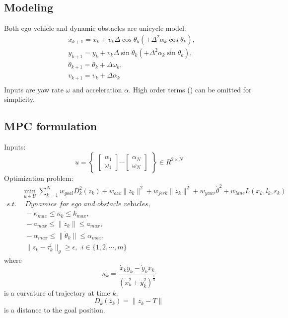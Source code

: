 \documentclass[12pt]{article}
\begin{document}
\subsection*{Modeling}
Both ego vehicle and dynamic obstacles are unicycle model.
\begin{equation}
\begin{split}
&x_{k+1}=x_{k}+v_{k}\Delta \cos\theta_{k}(+\Delta^{2}\alpha_{k}\cos\theta_{k}),\\
&y_{k+1}=y_{k}+v_{k}\Delta \sin\theta_{k}(+\Delta^{2}\alpha_{k}\sin\theta_{k}),\\
&\theta_{k+1}=\theta_{k}+\Delta \omega_{k},\\
&v_{k+1}=v_{k}+\Delta \alpha_{k}\\
\end{split}
\end{equation}
Inputs are yaw rate $\omega$ and acceleration $\alpha$. High order terms () can be omitted for simplicity.
\subsection*{MPC formulation}
Inputs:
\begin{equation}
u=
\begin{Bmatrix}
\begin{bmatrix}
\alpha_1\\ 
\omega_1
\end{bmatrix}
\cdots
\begin{bmatrix}
\alpha_N\\ 
\omega_N
\end{bmatrix}
\end{Bmatrix}\in R^{2\times N}
\end{equation}
Optimization problem:
\begin{equation}
\begin{split}
&\min_{u\in U}\sum_{k=1}^Nw_{goal}D^2_k(z_k)+w_{acc}\|\ddot{z}_k \|^2+w_{jerk}\|\dddot{z_k} \|^2 + w_{yawr}\dot{\theta}^2+w_{lane}L(x_k,l_k,r_k)\\
s.t.&~~ \textit{Dynamics for ego and obstacle vehicles},\\
&~~ -\kappa_{max} \leq \kappa_k \leq k_{max},\\
&~~ -a_{max} \leq \|\ddot{z}_k \| \leq a_{max},\\
&~~ -\alpha_{max} \leq \|\dot{\theta}_k \| \leq \alpha_{max},\\
&~~ \|z_k-\tau^i_k \|_g\geq\epsilon,~~i\in \{1,2,\cdots, m \}
\end{split}
\end{equation}
where 
\begin{equation}
\kappa_k=\frac{\dot{x}_k\ddot{y}_k-\dot{y}_k\ddot{x}_k}{(\dot{x}_k^2+\dot{y}_k^2)^{\frac{1}{3}}}
\end{equation}
is a curvature of trajectory at time $k$.
\begin{equation}
D_k(z_k)=\|z_k - T \|
\end{equation}
is a distance to the goal position.
\end{document}
